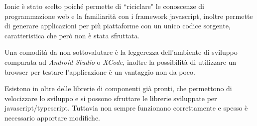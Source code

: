 \documentclass{article}
\begin{document}
Ionic è stato scelto poiché permette di ``riciclare" le conoscenze di programmazione web e la familiarità con i framework javascript, inoltre permette di generare applicazioni per più piattaforme con un unico codice sorgente, caratteristica che però non è stata sfruttata.

Una comodità da non sottovalutare è la leggerezza dell'ambiente di sviluppo comparata ad \textit{Android Studio} o \textit{XCode}, inoltre la possibilità di utilizzare un browser per testare l'applicazione è un vantaggio non da poco.

Esistono in oltre delle librerie di componenti già pronti, che permettono di velocizzare lo sviluppo e si possono sfruttare le librerie sviluppate per javascript/typescript. Tuttavia non sempre funzionano correttamente e spesso è necessario apportare modifiche.
\end{document}
